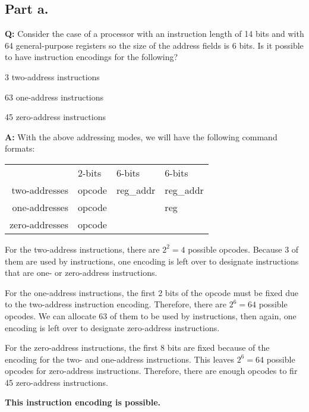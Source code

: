 \documentclass[a4paper]{article}
\begin{document}
  \subsection*{Part a.}
  \par \textbf{Q:}
  Consider the case of a processor with an instruction length of 14 bits and
  with 64 general-purpose registers so the size of the address fields is 6
  bits.
  Is it possible to have instruction encodings for the following?
  \begin{compactitem}
    \item 3 two-address instructions
    \item 63 one-address instructions
    \item 45 zero-address instructions
  \end{compactitem}
  \par \textbf{A:}
  With the above addressing modes, we will have the following command formats:
  \begin{center}
    \begin{tabular}[h]{r | p{1.2cm} | p{3cm} | p{3cm} |}
      \cline{2-4}
      & 2-bits & 6-bits & 6-bits \\ \cline{2-4}
      two-addresses & opcode & reg\_addr & reg\_addr \\ \cline{2-4}
      one-addresses & \multicolumn{2}{|l|}{opcode} & reg \\ \cline{2-4}
      zero-addresses & \multicolumn{3}{|l|}{opcode} \\ \cline{2-4}
    \end{tabular}
  \end{center}
  For the two-address instructions, there are $2^2 = 4$ possible opcodes.
  Because 3 of them are used by instructions, one encoding is left over to
  designate instructions that are one- or zero-address instructions.
  \par For the one-address instructions, the first 2 bits of the opcode must be
  fixed due to the two-address instruction encoding.
  Therefore, there are $2^6 = 64$ possible opcodes.
  We can allocate 63 of them to be used by instructions, then again, one
  encoding is left over to designate zero-address instructions.
  \par For the zero-address instructions, the first 8 bits are fixed because
  of the encoding for the two- and one-address instructions.
  This leaves $2^6 = 64$ possible opcodes for zero-address instructions.
  Therefore, there are enough opcodes to fir 45 zero-address instructions.
  \par \textbf{This instruction encoding is possible.}
\end{document}
